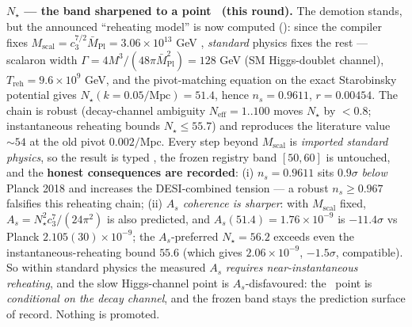 \documentclass[11pt,a4paper]{article}
\newcommand{\cthree}{c_3}
\begin{document}
\smallskip\noindent\textbf{$N_\star$ --- the band sharpened to a point \mC\ (this round).} The demotion
stands, but the announced ``reheating model'' is now computed (): since the
compiler fixes $M_{\mathrm{scal}}=\cthree^{7/2}\bar M_{\mathrm{Pl}}=3.06\times10^{13}$ GeV \mE,
\emph{standard} physics fixes the rest --- scalaron width
$\Gamma=4M^3/(48\pi\bar M_{\mathrm{Pl}}^2)=128$ GeV (SM Higgs-doublet channel),
$T_{\mathrm{reh}}=9.6\times10^{9}$ GeV, and the pivot-matching equation on the exact Starobinsky potential
gives $\boxed{N_\star(k{=}0.05/\mathrm{Mpc})=51.4}$, hence $n_s=0.9611$, $r=0.00454$. The chain is robust
(decay-channel ambiguity $N_{\mathrm{eff}}{=}1..100$ moves $N_\star$ by $<0.8$; instantaneous reheating
bounds $N_\star\le55.7$) and reproduces the literature value $\sim54$ at the old pivot $0.002/\mathrm{Mpc}$.
Every step beyond $M_{\mathrm{scal}}$ is \emph{imported standard physics}, so the result is typed \mC, the
frozen registry band $[50,60]$ is untouched, and the \textbf{honest consequences are recorded}:
(i) $n_s=0.9611$ sits $0.9\sigma$ \emph{below} Planck 2018 and increases the DESI-combined tension --- a
robust $n_s\ge0.967$ falsifies this reheating chain; (ii) \emph{$A_s$ coherence is sharper}: with
$M_{\mathrm{scal}}$ fixed, $A_s=N_\star^2\cthree^7/(24\pi^2)$ is also predicted, and
$A_s(51.4)=1.76\times10^{-9}$ is $-11.4\sigma$ vs Planck $2.105(30)\times10^{-9}$; the $A_s$-preferred
$N_\star=56.2$ exceeds even the instantaneous-reheating bound $55.6$ (which gives $2.06\times10^{-9}$,
$-1.5\sigma$, compatible). So within standard physics the measured $A_s$ \emph{requires near-instantaneous
reheating}, and the slow Higgs-channel point is $A_s$-disfavoured: the \mC\ point is \emph{conditional on
the decay channel}, and the frozen band stays the prediction surface of record. Nothing is promoted.
\end{document}

